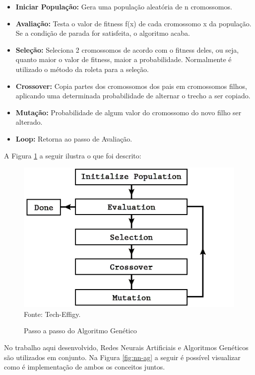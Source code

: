 \documentclass[12pt,a4paper]{article}
\newcommand{\source}[1]{\small Fonte: {#1}}
\begin{document}
	\begin{itemize}[noitemsep]
		\item \textbf{Iniciar População:} Gera uma população aleatória de n cromossomos.
		\item \textbf{Avaliação:} Testa o valor de fitness f(x) de cada cromossomo x da população.
		Se a condição de parada for satisfeita, o algoritmo acaba.
		\item \textbf{Seleção:} Seleciona 2 cromossomos de acordo com o fitness deles,
		ou seja, quanto maior o valor de fitness, maior a probabilidade.
		Normalmente é utilizado o método da roleta para a seleção.
		\item \textbf{Crossover:} Copia partes dos cromossomos dos pais em cromossomos filhos,
		aplicando uma determinada probabilidade de alternar o trecho a ser copiado.
		\item \textbf{Mutação:} Probabilidade de algum valor do cromossomo do novo filho ser alterado.
		\item \textbf{Loop:} Retorna ao passo de Avaliação.
	\end{itemize}
	
	A Figura \ref{fig:gaflow} a seguir ilustra o que foi descrito:
	
	\begin{figure}[ht!]
		\centering
		\caption{Passo a passo do Algoritmo Genético}
		\includegraphics[scale=0.8]{GeneticAlgorithmFlow.png}\\
		\vspace{0.5mm}
		\source{Tech-Effigy.}
		\label{fig:gaflow}
	\end{figure}
	
	\FloatBarrier
	No trabalho aqui desenvolvido,
	Redes Neurais Artificiais e Algoritmos Genéticos são utilizados em conjunto.
	Na Figura \ref{fig:nn-ag} a seguir é possível visualizar como é implementação de ambos os conceitos juntos.
	
\end{document}
